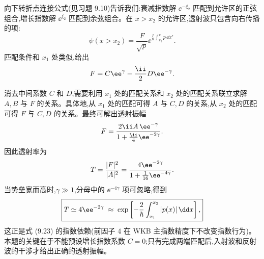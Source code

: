\begin{solution}
向下转折点连接公式(见习题 9.10)告诉我们:衰减指数解 $\ee^{-\xi_2}$ 匹配到允许区的正弦组合,增长指数解 $\ee^{\xi_2}$ 匹配到余弦组合。在 $x>x_2$ 的允许区,透射波只包含向右传播的项:
\[
\psi(x>x_2)=\frac{F}{\sqrt{p}}\ee^{\frac{\ii}{\hbar}\int_{x_2}^x p\,\dd x'}.
\]
匹配条件和 $x_1$ 处类似,给出
\[
F = C\ee^{\gamma}-{\ii\over2}D\ee^{-\gamma}.
\]

消去中间系数 $C$ 和 $D$,需要利用 $x_1$ 处的匹配关系和 $x_2$ 处的匹配关系联立求解 $A,B$ 与 $F$ 的关系。具体地,从 $x_1$ 处的匹配可得 $A$ 与 $C,D$ 的关系,从 $x_2$ 处的匹配可得 $F$ 与 $C,D$ 的关系。最终可解出透射振幅
\[
F = {2\ii A\,\ee^{-\gamma}\over 1+{\ii\over4}\ee^{-2\gamma}}.
\]
因此透射率为
\[
T={|F|^2\over|A|^2}
={4\ee^{-2\gamma}\over 1+{1\over16}\ee^{-4\gamma}}.
\]
当势垒宽而高时,$\gamma\gg1$,分母中的 $\ee^{-4\gamma}$ 项可忽略,得到
\[
\boxed{T\simeq 4\ee^{-2\gamma}
\;\approx\; \exp\left[-{2\over\hbar}\int_{x_1}^{x_2}|p(x)|\,\dd x\right],}
\]
这正是式 (9.23) 的指数依赖(前因子 $4$ 在 WKB 主指数精度下不改变指数行为)。本题的关键在于不能预设增长指数系数 $C=0$;只有完成两端匹配后,入射波和反射波的干涉才给出正确的透射振幅。
\end{solution}


